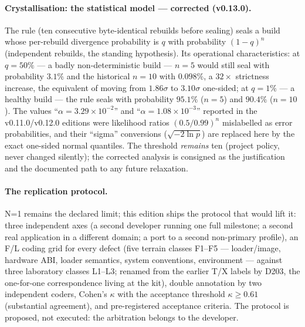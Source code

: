 \documentclass[10pt,a4paper]{article}
\begin{document}
\paragraph{Crystallisation: the statistical model --- corrected (v0.13.0).}
The rule (ten consecutive byte-identical rebuilds before sealing) seals
a build whose per-rebuild divergence probability is $q$ with probability
$(1-q)^n$ (independent rebuilds, the standing hypothesis). Its
operational characteristics: at $q = 50\%$ --- a badly
non-deterministic build --- $n = 5$ would still seal with probability
$3.1\%$ and the historical $n = 10$ with $0.098\%$, a $32\times$
strictness increase, the equivalent of moving from $1.86\sigma$ to
$3.10\sigma$ one-sided; at $q = 1\%$ --- a healthy build --- the rule
seals with probability $95.1\%$ ($n{=}5$) and $90.4\%$ ($n{=}10$). The
values ``$\alpha = 3.29\times10^{-2}$'' and ``$\alpha = 1.08\times
10^{-3}$'' reported in the v0.11.0/v0.12.0 editions were likelihood
ratios $(0.5/0.99)^n$ mislabelled as error probabilities, and their
``sigma'' conversions ($\sqrt{-2\ln p}$) are replaced here by the exact
one-sided normal quantiles. The threshold \emph{remains} ten (project
policy, never changed silently); the corrected analysis is consigned as
the justification and the documented path to any future relaxation.

\paragraph{The replication protocol.} N=1 remains the declared limit;
this edition ships the protocol that would lift it: three independent
axes (a second developer running one full milestone; a second real
application in a different domain; a port to a second non-primary
profile), an F/L coding grid for every defect (five terrain classes F1--F5
--- loader/image, hardware ABI, loader semantics, system conventions,
environment --- against three laboratory classes L1--L3; renamed from
the earlier T/X labels by D203, the one-for-one correspondence living
at the kit), double
annotation by two independent coders, Cohen's $\kappa$ with the
acceptance threshold $\kappa \ge 0.61$ (substantial agreement), and
pre-registered acceptance criteria. The protocol is proposed, not
executed: the arbitration belongs to the developer.

\end{document}
